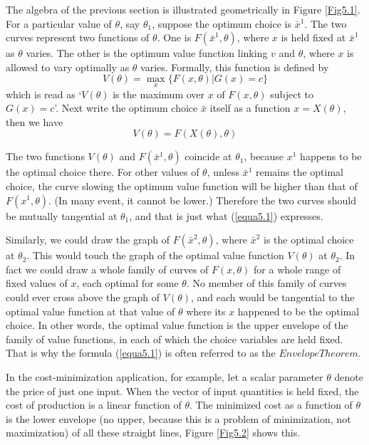 The algebra of the previous section is illustrated geometrically in Figure \ref{Fig5.1}. For a particular value of $\theta$, say $\theta_1$, suppose the optimum choice is $\bar{x}^1$. The two curves represent two functions of $\theta$. One is $F(\bar{x}^1, \theta)$, where $x$ is held fixed at $\bar{x}^1$ as $\theta$ varies. The other is the optimum value function linking $v$ and $\theta$, where $x$ is allowed to vary optimally as $\theta$ varies. Formally, this function is defined by
\begin{equation} \label{equa5.3}
V(\theta) = \mathop{\max}_{x} \{  F(x, \theta)| G(x)=c  \}
\end{equation}
which is read as `$V(\theta)$ is the maximum over $x$ of $F(x,\theta)$ subject to $G(x)=c$'. Next write the optimum choice $\bar{x}$ itself as a function $x = X(\theta)$, then we have
\begin{equation*}  
V(\theta) = F(X(\theta), \theta)
\end{equation*}

The two functions $V(\theta)$ and $F(\bar{x}^1, \theta)$ coincide at $\theta_1$, because $x^1$ happens to be the optimal choice there. For other values of $\theta$, unless $\bar{x}^1$ remains the optimal choice, the curve slowing the optimum value function will be higher than that of $F(x^1  ,\theta )$. (In many event, it cannot be lower.) Therefore the two curves should be mutually tangential at $\theta_1$, and that is just what (\ref{equa5.1}) expresses.

Similarly, we could draw the graph of $F(\bar{x}^2, \theta)$, where $\bar{x}^2$ is the optimal choice at $\theta_2$. This would touch the graph of the optimal value function $V(\theta)$ at $\theta_2$. In fact we could draw a whole family of curves of $F(x, \theta)$ for a whole range of fixed values of $x$, each optimal for some $\theta$. No member of this family of curves could ever cross above the graph of $V(\theta)$, and each would be tangential to the optimal value function at that value of $\theta$ where its $x$ happened to be the optimal choice. In other words, the optimal value function is the upper envelope of the family of value functions, in each of which the choice variables are held fixed. That is why the formula (\ref{equa5.1}) is often referred to as the $Envelope Theorem$.

In the cost-minimization application, for example, let a scalar parameter $\theta$ denote the price of just one input. When the vector of input quantities is held fixed, the cost of production is a linear function of $\theta$. The minimized cost as a function of $\theta$ is the lower envelope (no upper, because this is a problem of minimization, not maximization) of all these straight lines, Figure \ref{Fig5.2} shows this.

